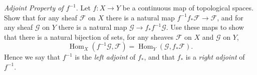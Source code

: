 \documentclass[10pt]{article}
\theoremstyle{definition}
\theoremstyle{remark}
\numberwithin{equation}{section}
\numberwithin{figure}{subsubsection}
\DeclareMathOperator{\Hom}{Hom}
\begin{document}
\begin{problem}
  \emph{Adjoint Property of $f^{-1}$}. Let $f\colon X \to Y$ be a continuous map of topological spaces. Show that for any sheaf $\mathscr{F}$ on $X$ there is a natural map $f^{-1}f_*\mathscr{F} \to \mathscr{F}$, and for any sheaf $\mathscr{G}$ on $Y$ there is a natural map $\mathscr{G} \to f_*f^{-1}\mathscr{G}$. Use these maps to show that there is a natural bijection of sets, for any sheaves $\mathscr{F}$ on $X$ and $\mathscr{G}$ on $Y$,
  \begin{equation*}
    \Hom_X(f^{-1}\mathscr{G},\mathscr{F}) = \Hom_Y(\mathscr{G},f_*\mathscr{F}).
  \end{equation*}
  Hence we say that $f^{-1}$ is the \emph{left adjoint} of $f_*$, and that $f_*$ is a \emph{right adjoint} of $f^{-1}$.
\end{problem}
\end{document}

